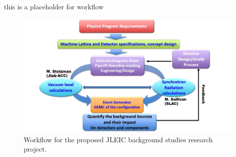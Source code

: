 this is a placeholder for workflow

\begin{figure}
	\centering
	\includegraphics[width=.75\textwidth]{../../img/proposal_workflow.jpg}
	\caption{Workflow for the proposed JLEIC background studies research project.}
	\label{fig:workflow1}
\end{figure}